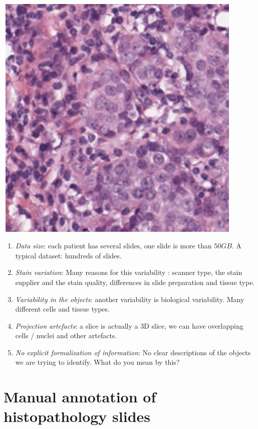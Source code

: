 \documentclass[a0,portrait]{a0poster}
\begin{document}
\begin{multicols}{2}
\begin{center}
   \includegraphics[height=12cm, width = 12cm]{histo3.png}
\end{center}

\begin{enumerate}
\item {\em Data size}: each patient has several slides, one slide is more than $50 GB$. A typical dataset: hundreds of slides. 

\item {\em Stain variation}: Many reasons for this variability : 
 scanner type, the stain supplier and
  the stain quality, differences in slide preparation and tissue
  type. 
\item {\em Variability in the objects}: another variability is biological variability. Many different cells and tissue types.
\item {\em Projection artefacts}: a slice is actually a 3D slice, we can have overlapping cells / nuclei
  and other artefacts.
\item {\em No explicit formalization of information}:
  No clear descriptions of the objects we are trying to identify.
  {\red What do you mean by this? }
\end{enumerate}

\section*{Manual annotation of histopathology slides}


\end{multicols}
\end{document}
